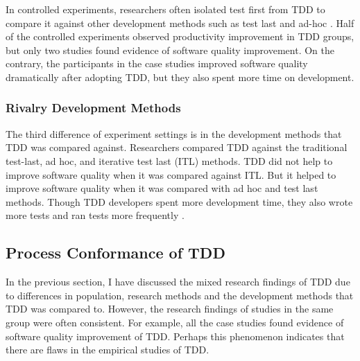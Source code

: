 In controlled experiments, researchers often isolated test
first from TDD to compare it against other development 
methods such as test last and ad-hoc \cite{Muller:02,Matjaz:03,
Erdogmus:05,George:03,Geras:04}. Half of the controlled 
experiments \cite{George:03,Kaufmann:03,Erdogmus:05} observed 
productivity improvement in TDD groups, but only two studies 
found evidence of software quality improvement. On the contrary, 
the participants in the case studies improved software quality 
dramatically after adopting TDD, but they also spent more time 
on development.  

\subsubsection{Rivalry Development Methods}
The third difference of experiment settings is in the 
development methods that TDD was compared against. Researchers 
compared TDD against the traditional test-last\cite{Kaufmann:03,Geras:04}, 
ad hoc\cite{Muller:02,George:03}, and iterative test last 
(ITL) \cite{Matjaz:03,Erdogmus:05} methods. TDD did not help to 
improve software quality when it was compared against ITL. 
But it helped to improve software quality when it was compared 
with ad hoc and test last methods. Though TDD developers 
spent more development time, they also wrote more tests 
\cite{George:03,Erdogmus:05} and ran tests more frequently
\cite{Geras:04}.

\subsection{Process Conformance of TDD}
In the previous section, I have discussed the mixed research 
findings of TDD due to differences in population, research 
methods and the development methods that TDD was compared 
to. However, the research findings of studies in the same group  
were often consistent. For example, all the case studies found 
evidence of software quality improvement of TDD. Perhaps this 
phenomenon indicates that there are flaws in the empirical
studies of TDD. 

